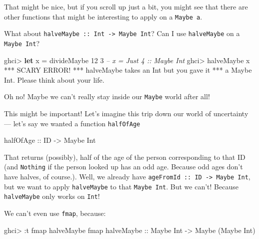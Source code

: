 \documentclass[]{article}
\newenvironment{Shaded}{}{}
\newcommand{\CommentTok}[1]{\textcolor[rgb]{0.38,0.63,0.69}{\textit{#1}}}
\newcommand{\DataTypeTok}[1]{\textcolor[rgb]{0.56,0.13,0.00}{#1}}
\newcommand{\DecValTok}[1]{\textcolor[rgb]{0.25,0.63,0.44}{#1}}
\newcommand{\FunctionTok}[1]{\textcolor[rgb]{0.02,0.16,0.49}{#1}}
\newcommand{\KeywordTok}[1]{\textcolor[rgb]{0.00,0.44,0.13}{\textbf{#1}}}
\newcommand{\NormalTok}[1]{#1}
\newcommand{\OtherTok}[1]{\textcolor[rgb]{0.00,0.44,0.13}{#1}}
\begin{document}
That might be nice, but if you scroll up just a bit, you might see that there
are other functions that might be interesting to apply on a \texttt{Maybe\ a}.

What about \texttt{halveMaybe\ ::\ Int\ -\textgreater{}\ Maybe\ Int}? Can I use
\texttt{halveMaybe} on a \texttt{Maybe\ Int}?

\begin{Shaded}
\begin{Highlighting}[]
\NormalTok{ghci}\FunctionTok{>} \KeywordTok{let}\NormalTok{ x }\FunctionTok{=}\NormalTok{ divideMaybe }\DecValTok{12} \DecValTok{3}     \CommentTok{-- x = Just 4 :: Maybe Int}
\NormalTok{ghci}\FunctionTok{>}\NormalTok{ halveMaybe x}
\FunctionTok{***} \DataTypeTok{SCARY} \DataTypeTok{ERROR}\FunctionTok{!}
\FunctionTok{***}\NormalTok{ halveMaybe takes an }\DataTypeTok{Int}\NormalTok{ but you gave it}
\FunctionTok{***}\NormalTok{ a }\DataTypeTok{Maybe} \DataTypeTok{Int}\FunctionTok{.}  \DataTypeTok{Please}\NormalTok{ think about your life}\FunctionTok{.}
\end{Highlighting}
\end{Shaded}

Oh no! Maybe we can't really stay inside our \texttt{Maybe} world after all!

This might be important! Let's imagine this trip down our world of uncertainty
--- let's say we wanted a function \texttt{halfOfAge}

\begin{Shaded}
\begin{Highlighting}[]
\OtherTok{halfOfAge ::} \DataTypeTok{ID} \OtherTok{->} \DataTypeTok{Maybe} \DataTypeTok{Int}
\end{Highlighting}
\end{Shaded}

That returns (possibly), half of the age of the person corresponding to that ID
(and \texttt{Nothing} if the person looked up has an odd age. Because odd ages
don't have halves, of course.). Well, we already have
\texttt{ageFromId\ ::\ ID\ -\textgreater{}\ Maybe\ Int}, but we want to apply
\texttt{halveMaybe} to that \texttt{Maybe\ Int}. But we can't! Because
\texttt{halveMaybe} only works on \texttt{Int}!

We can't even use \texttt{fmap}, because:

\begin{Shaded}
\begin{Highlighting}[]
\NormalTok{ghci}\FunctionTok{>} \FunctionTok{:}\NormalTok{t fmap halveMaybe}
\NormalTok{fmap}\OtherTok{ halveMaybe ::} \DataTypeTok{Maybe} \DataTypeTok{Int} \OtherTok{->} \DataTypeTok{Maybe}\NormalTok{ (}\DataTypeTok{Maybe} \DataTypeTok{Int}\NormalTok{)}
\end{Highlighting}
\end{Shaded}
\end{document}
